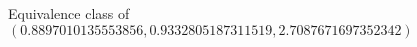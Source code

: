 \documentclass[preview]{standalone}
\begin{document}
\begin{center}
Equivalence class of $(0.8897010135553856, 0.9332805187311519, 2.7087671697352342)$
\end{center}
\end{document}
